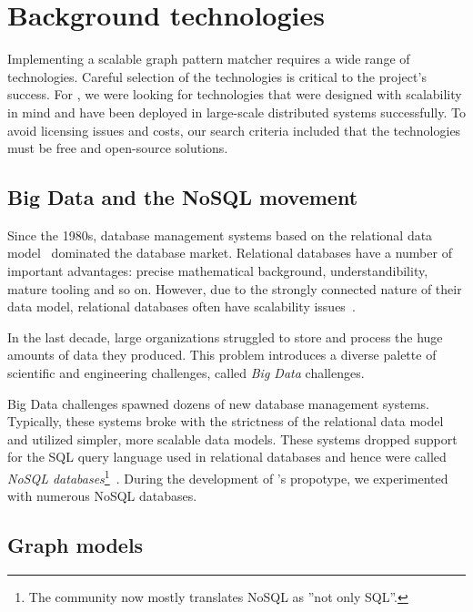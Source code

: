 \chapter{Background technologies}
 
Implementing a scalable graph pattern matcher requires a wide range of technologies. Careful selection of the technologies is critical to the project's success. For \iqd, we were looking for technologies that were designed with scalability in mind and have been deployed in large-scale distributed systems successfully. To avoid licensing issues and costs, our search criteria included that the technologies must be free and open-source solutions. 


\section{Big Data and the NoSQL movement}

Since the 1980s, database management systems based on the relational data model~\cite{Codd:1970:RMD:362384.362685} dominated the database market. Relational databases have a number of important advantages: precise mathematical background, understandibility, mature tooling and so on. However, due to the strongly connected nature of their data model, relational databases often have scalability issues~\cite{Jacobs:2009:PBD:1536616.1536632, Sakr13}.

In the last decade, large organizations struggled to store and process the huge amounts of data they produced. This problem introduces a diverse palette of scientific and engineering challenges, called \emph{Big Data} challenges. 

Big Data challenges spawned dozens of new database management systems. Typically, these systems broke with the strictness of the relational data model and utilized simpler, more scalable data models. These systems dropped support for the SQL query language used in relational databases and hence were called \emph{NoSQL databases}\footnote{The community now mostly translates NoSQL as ''not only SQL''.}~\cite{NoSQL}. During the development of \iqd's propotype, we experimented with numerous NoSQL databases.

\section{Graph models}

